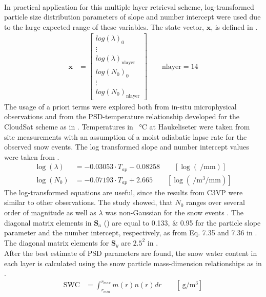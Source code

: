 \\
In practical application for this multiple layer retrieval scheme, log-transformed particle size distribution parameters of slope and number intercept were used due to the large expected range of these variables. The state vector, $\mathbf{x}$, is defined in .
\begin{align}
	\mathbf{x} & = \begin{bmatrix}
		log(\lambda)_0 	\\
		\vdots 			\\
		log(\lambda)_{\text{nlayer}} 	\\
		log(N_0)_0		\\
		\vdots			\\
		log(N_0)_{\text{nlayer}}		
	\end{bmatrix} \qquad \text{nlayer} = 14
	\label{eq:snow_prop}
\end{align}
The usage of a priori terms were explored both from in-situ microphysical observations and from the PSD-temperature relationship developed for the CloudSat scheme as in . Temperatures in \SI{}{\celsius} at Haukeliseter were taken from site measurements with an assumption of a moist adiabatic lapse rate for the observed snow events. The log transformed slope and number intercept values were taken from \citet{wood_estimation_2011}. 
\begin{align}
	\log(\lambda) & = -0.03053 \cdot T_{ap} - 0.08258  \label{eq:lambda} \qquad [ \log(\SI{}{\per\mm}) ] \\
	\log(N_0) & = -0.07193 \cdot T_{ap} +2.665  \qquad [ \log(\SI{}{\per\cubic\metre\per\mm})]
	\label{eq:N0}
\end{align}
The log-transformed equations are useful, since the results from C3VP were similar to other observations. The study showed, that $N_0$ ranges over several order of magnitude as well as $\lambda$ was non-Gaussian for the snow events \citet{wood_estimation_2011}. The diagonal matrix elements in $\mathbf{S}_a$ () are equal to \numlist{0.133;0.95} for the particle slope parameter and the number intercept, respectively, as from Eq. 7.35 and 7.36 in \citet{wood_estimation_2011}. The diagonal matrix elements for $\mathbf{S}_y$ are $2.5^2$ in .
\\
After the best estimate of PSD parameters are found, the snow water content in each layer is calculated using the snow particle mass-dimension relationships as in . 
%
\begin{align}
	\text{SWC} & = \int_{r_{min}}^{r_{max}} m(r) n(r) dr \qquad [\SI{}{\gram\per\cubic\metre}] \label{eq:SWC}
\end{align}
